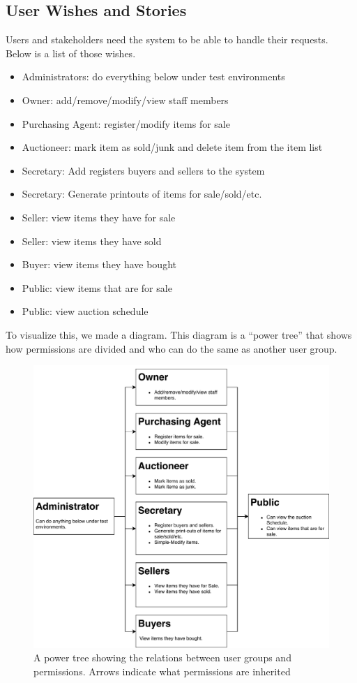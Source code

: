 \documentclass{article}
\begin{document}
\subsection*{User Wishes and Stories}
Users and stakeholders need the system to be able to handle their requests. Below is a list of those wishes.
\begin{itemize}[noitemsep]
	\item Administrators: do everything below under test environments
	\item Owner: add/remove/modify/view staff members
	\item Purchasing Agent: register/modify items for sale
	\item Auctioneer: mark item as sold/junk and delete item from the item list
	\item Secretary: Add registers buyers and sellers to the system
	\item Secretary: Generate printouts of items for sale/sold/etc.
	\item Seller: view items they have for sale
	\item Seller: view items they have sold
	\item Buyer: view items they have bought
	\item Public: view items that are for sale
	\item Public: view auction schedule
\end{itemize}
To visualize this, we made a diagram. This diagram is a ``power tree'' that shows how permissions are divided and who can do the same as another user group.
\begin{figure}[H]
	\centering
	\includegraphics[scale=.75]{power_tree.pdf}
	\caption*{A power tree showing the relations between user groups and permissions. Arrows indicate what permissions are inherited}
\end{figure}
\end{document}
